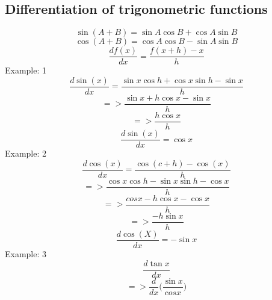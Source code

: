 	
	
	\subsection{Differentiation of trigonometric functions}
	\begin{equation}
	\sin(A+B) = \sin A\cos B+\cos A\sin B
	\end{equation}
	\begin{equation}
	\cos(A+B) = \cos A\cos B - \sin A\sin B
	\end{equation}
	\begin{equation}
	\frac{df(x)}{dx} = \frac{f(x+h)-x}{h}
	\end{equation}
	\newline
	Example: 1
	\begin{displaymath}
	\frac{d\sin(x)}{dx} = \frac{\sin x \cos h+\cos x\sin h-\sin x}{h}
	\end{displaymath}
	\begin{displaymath}
	=> \frac{\sin x + h\cos x - \sin x}{h}
	\end{displaymath}
	\begin{displaymath}
	=>\frac{h\cos x}{h}
	\end{displaymath}
	\begin{equation}
	\frac{d\sin(x)}{dx} = \cos x
	\end{equation}
	\newline
	Example: 2
	\begin{displaymath}
	\frac{d\cos(x)}{dx} = \frac{\cos(c+h)-\cos (x)}{h}
	\end{displaymath}
	\begin{displaymath}
	=> \frac{\cos x \cos h-\sin x \sin h - \cos x}{h}
	\end{displaymath}
	\begin{displaymath}
	=> \frac{cos x- h \cos x - \cos x}{h}
	\end{displaymath}
	\begin{displaymath}
	=> \frac{-h\sin x}{h}
	\end{displaymath}
	\begin{equation}
	\frac{d\cos (X)}{dx} = -\sin x
	\end{equation}
	\newline
	Example: 3
	\begin{displaymath}
	\frac{d\tan x}{dx}
	\end{displaymath}
	\begin{displaymath}
	=>\frac{d}{dx}\bigg(\frac{\sin x}{cos x}\bigg)
	\end{displaymath}
